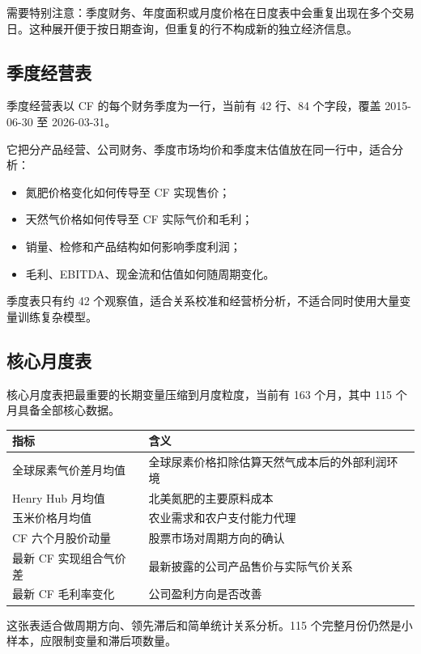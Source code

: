 \documentclass[11pt,a4paper]{ctexart}
\begin{document}
需要特别注意：季度财务、年度面积或月度价格在日度表中会重复出现在多个交易日。这种展开便于按日期查询，但重复的行不构成新的独立经济信息。

\subsection{季度经营表}

季度经营表以 CF 的每个财务季度为一行，当前有 42 行、84 个字段，覆盖 2015-06-30 至 2026-03-31。

它把分产品经营、公司财务、季度市场均价和季度末估值放在同一行中，适合分析：

\begin{itemize}
  \item 氮肥价格变化如何传导至 CF 实现售价；
  \item 天然气价格如何传导至 CF 实际气价和毛利；
  \item 销量、检修和产品结构如何影响季度利润；
  \item 毛利、EBITDA、现金流和估值如何随周期变化。
\end{itemize}

季度表只有约 42 个观察值，适合关系校准和经营桥分析，不适合同时使用大量变量训练复杂模型。

\subsection{核心月度表}

核心月度表把最重要的长期变量压缩到月度粒度，当前有 163 个月，其中 115 个月具备全部核心数据。

\begin{center}
\small
\begin{tabularx}{\textwidth}{L{4.4cm}Y}
\toprule
指标 & 含义 \\
\midrule
全球尿素气价差月均值 & 全球尿素价格扣除估算天然气成本后的外部利润环境 \\
Henry Hub 月均值 & 北美氮肥的主要原料成本 \\
玉米价格月均值 & 农业需求和农户支付能力代理 \\
CF 六个月股价动量 & 股票市场对周期方向的确认 \\
最新 CF 实现组合气价差 & 最新披露的公司产品售价与实际气价关系 \\
最新 CF 毛利率变化 & 公司盈利方向是否改善 \\
\bottomrule
\end{tabularx}
\normalsize
\end{center}

这张表适合做周期方向、领先滞后和简单统计关系分析。115 个完整月份仍然是小样本，应限制变量和滞后项数量。
\end{document}
